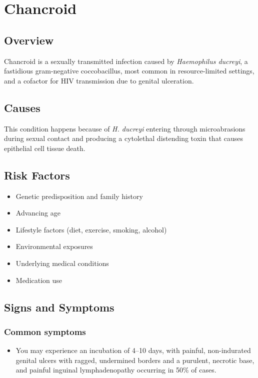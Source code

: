 \chapter{Chancroid}
\label{sec:Chancroid}

\section{Overview}
Chancroid is a sexually transmitted infection caused by \textit{Haemophilus ducreyi}, a fastidious gram-negative coccobacillus, most common in resource-limited settings, and a cofactor for HIV transmission due to genital ulceration.
\section{Causes}
This condition happens because of \textit{H. ducreyi} entering through microabrasions during sexual contact and producing a cytolethal distending toxin that causes epithelial cell tissue death.     
\section{Risk Factors}

\begin{itemize}[noitemsep]
  \item Genetic predisposition and family history
  \item Advancing age
  \item Lifestyle factors (diet, exercise, smoking, alcohol)
  \item Environmental exposures
  \item Underlying medical conditions
  \item Medication use
\end{itemize}
\section{Signs and Symptoms}

\subsection{Common symptoms}
\begin{itemize}[noitemsep]
  \item You may experience an incubation of 4--10 days, with painful, non-indurated genital ulcers with ragged, undermined borders and a purulent, necrotic base, and painful inguinal lymphadenopathy occurring in 50\% of cases. 
  \end{itemize}

